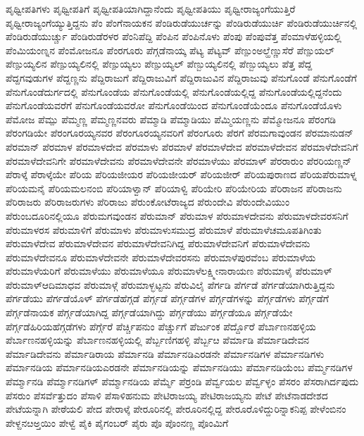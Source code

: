 {ಪೃಥ್ವೀಪತಿಗಳು
ಪೃಥ್ವೀಪತಿಗೆ
ಪೃಥ್ವೀಪತಿಯಾಗಿದ್ದಾನೆಂದು
ಪೃಥ್ವೀಪತಿಯು
ಪೃಥ್ವೀರಾಜ್ಯಂಗೆಯುತ್ತಿರೆ
ಪೃಥ್ವೀರಾಜ್ಯಂಗೆಯ್ಯುತ್ತಿದ್ದನು
ಪೆಂ
ಪೆಂಗೆನಾಯಕನ
ಪೆಂಡಿರುಡೆಯುರ್ಚನ್ನು
ಪೆಂಡಿರುಡೆಯುರ್ಚಿ
ಪೆಂಡಿರುಡೆಯುರ್ಚಿನಲ್ಲಿ
ಪೆಂಡಿರುಡೆಯುರ್ಚ್ಚು
ಪೆಂಡಿರುಡೆರಳರ
ಪೆಂನಿಪೆದ್ದಿ
ಪೆಂಪಿನ
ಪೆಂಪಿನೊಳು
ಪೆಂಪು
ಪೆಂಪುವೆತ್ತ
ಪೆಂಮಾಳೆಹಳ್ಳಿಯಲ್ಲಿ
ಪೆಂಮಿಯಂಣ್ನನ
ಪೆಂಮೋಜನೂ
ಪೆಂರಗೂರು
ಪೆಗ್ಗಡೆನಾಯ್ಕ
ಪೆಟ್ಯ
ಪೆಟ್ಯವ್
ಪೆಣ್ಪುಂಅಲ್ಹೆಣ್ಣುಸೆರೆ
ಪೆಣ್ಪುಯಲ್
ಪೆಣ್ಪುಯ್ಯಲಿನ
ಪೆಣ್ಪುಯ್ಯಲಿನಲ್ಲಿ
ಪೆಣ್ಪುಯ್ಯಲು
ಪೆಣ್ಪುಯ್ಯಲ್
ಪೆಣ್ಬುಯ್ಯಲಿನಲ್ಲಿ
ಪೆಣ್ಬುಯ್ಯಲು
ಪೆತ್ತ
ಪೆದ್ದ
ಪೆದ್ದಗವುಡುಗಳ
ಪೆದ್ದಣ್ಣನು
ಪೆದ್ದಿರಾಜುಗೆ
ಪೆದ್ದಿರಾಜುವಿಗೆ
ಪೆದ್ದಿರಾಜುವಿನ
ಪೆದ್ದಿರಾಜುವು
ಪೆನುಗೊಂಡೆ
ಪೆನುಗೊಂಡೆಗೆ
ಪೆನುಗೊಂಡೆದುರ್ಗದಲ್ಲಿ
ಪೆನುಗೊಂಡೆಯ
ಪೆನುಗೊಂಡೆಯಲ್ಲಿ
ಪೆನುಗೊಂಡೆಯಲ್ಲಿದ್ದ
ಪೆನುಗೊಂಡೆಯಲ್ಲಿದ್ದನೆಂದು
ಪೆನುಗೊಂಡೆಯವರೆಗೆ
ಪೆನುಗೊಂಡೆಯವರೋ
ಪೆನುಗೊಂಡೆಯಿಂದ
ಪೆನುಗೊಂಡೆಯೆಂದೂ
ಪೆನುಗೊಂಡೆಯೊಳು
ಪೆಮೋಜ
ಪೆಮ್ಪು
ಪೆಮ್ಮಣ್ಣ
ಪೆಮ್ಮಣ್ಣನವರು
ಪೆಮ್ಮಾಡಿ
ಪೆಮ್ಮಾಡಿಯು
ಪೆಮ್ಮಿಯಣ್ಣನು
ಪೆಮ್ಮೋಜನೂ
ಪೆರಂಗಡಿ
ಪೆರಂಗಡಿಯೇ
ಪೆರಂಗೂರಯ್ಯನವರ
ಪೆರಂಗೂರಯ್ಯನವರಿಗೆ
ಪೆರಂಗೂರು
ಪೆರಗೆ
ಪೆರಮಗಾವುಂಡನ
ಪೆರಮಾನುಡನ್
ಪೆರಮಾನ್
ಪೆರಮಾಳ
ಪೆರಮಾಳದೇವ
ಪೆರಮಾಳು
ಪೆರಮಾಳೆ
ಪೆರಮಾಳೆದೇವ
ಪೆರಮಾಳೆದೇವನ
ಪೆರಮಾಳೆದೇವನಿಗೆ
ಪೆರಮಾಳೆದೇವನಿಗೇ
ಪೆರಮಾಳೆದೇವನು
ಪೆರಮಾಳೆದೇವನೇ
ಪೆರಮಾಳೆಯು
ಪೆರಮಾಳ್
ಪೆರರಾರುಂ
ಪೆರರಿಯಣ್ಣನ್
ಪೆರಾಳ್ಕೆ
ಪೆರಾಳ್ಕೆಯೇ
ಪೆರಿಯ
ಪೆರಿಯಜೀಯರ
ಪೆರಿಯಜೀಯರ್
ಪೆರಿಯಜೀರ್
ಪೆರಿಯಪುರಾಣದ
ಪೆರಿಯಪೆರುಮಾಳ್ನ
ಪೆರಿಯಮನೈ
ಪೆರಿಯಮಲನಂಬಿ
ಪೆರಿಯಾಳ್ವಾನ್
ಪೆರಿಯಾಳ್ವಿ
ಪೆರಿಯೇರಿ
ಪೆರಿಯೇರಿಯ
ಪೆರಿರಾಜನ
ಪೆರಿರಾಜನು
ಪೆರಿರಾಜರು
ಪೆರಿರಾಜರುಗಳು
ಪೆರಿರಾಜು
ಪೆರುಂಕೋಟೆರಾಜ್ಯದ
ಪೆರುಂದೇವಿ
ಪೆರುಂದೇವಿಯುಂ
ಪೆರುಂಬದೂರಿನಲ್ಲಿಯೂ
ಪೆರುಮಗವುಂಡನ
ಪೆರುಮಾನ್
ಪೆರುಮಾಳ
ಪೆರುಮಾಳದೇವನು
ಪೆರುಮಾಳದೇವರಸನಿಗೆ
ಪೆರುಮಾಳರಸ
ಪೆರುಮಾಳಿಗೆ
ಪೆರುಮಾಳು
ಪೆರುಮಾಳುಸಮುದ್ರ
ಪೆರುಮಾಳೆ
ಪೆರುಮಾಳೆಚಮೂಪತಿಗಿಂತು
ಪೆರುಮಾಳೆದೇವ
ಪೆರುಮಾಳೆದೇವನ
ಪೆರುಮಾಳೆದೇವನಿಗಿದ್ದ
ಪೆರುಮಾಳೆದೇವನಿಗೆ
ಪೆರುಮಾಳೆದೇವನು
ಪೆರುಮಾಳೆದೇವನೂ
ಪೆರುಮಾಳೆದೇವನೇ
ಪೆರುಮಾಳೆದೇವರಸನು
ಪೆರುಮಾಳೆಪುರವೆಂಬ
ಪೆರುಮಾಳೆಯ
ಪೆರುಮಾಳೆಯರಿಗೆ
ಪೆರುಮಾಳೆಯು
ಪೆರುಮಾಳೆಯೂ
ಪೆರುಮಾಳೆಲಕ್ಷ್ಮೀನಾರಾಯಣ
ಪೆರುಮಾಳೈ
ಪೆರುಮಾಳ್
ಪೆರುಮಾಳ್ಆದಿಮಾಧವ
ಪೆರುಮಾಳ್ಗೆ
ಪೆರುಮಾಳ್ಭಟ್ಟನು
ಪೆರುವಿಲೈ
ಪೆರ್ಗಡಿ
ಪೆರ್ಗಡೆ
ಪೆರ್ಗಡೆಯಾಗಿರುತ್ತಿದ್ದನು
ಪೆರ್ಗಡೆಯು
ಪೆರ್ಗಡೆಯೊಳ್
ಪೆರ್ಗಡೆಹೆಗ್ಗಡೆ
ಪೆರ್ಗ್ಗಡೆ
ಪೆರ್ಗ್ಗಡೆಗಳ
ಪೆರ್ಗ್ಗಡೆಗಳನ್ನು
ಪೆರ್ಗ್ಗಡೆಗಳು
ಪೆರ್ಗ್ಗಡೆಗೆ
ಪೆರ್ಗ್ಗಡೆನಾಯಕ
ಪೆರ್ಗ್ಗಡೆಯಾಗಿದ್ದ
ಪೆರ್ಗ್ಗಡೆಯಾಗಿದ್ದು
ಪೆರ್ಗ್ಗಡೆಯು
ಪೆರ್ಗ್ಗಡೆಯೂ
ಪೆರ್ಗ್ಗಡೆಯೇ
ಪೆರ್ಗ್ಗಡೆಹಿರಿಯಹೆಗ್ಗಡೆಗಳು
ಪೆರ್ಗ್ಗೆರೆ
ಪೆರ್ಚ್ಚಿಪನುಂ
ಪೆರ್ಚ್ಚುಗೆ
ಪೆರ್ಜುಂಕ
ಪೆರ್ದ್ದೊರೆ
ಪೆರ್ಬಾಣನಹಳ್ಳಿಯ
ಪೆರ್ಬಾಣನಹಳ್ಳಿಯನ್ನು
ಪೆರ್ಬಾಣನಹಳ್ಳಿಯಲ್ಲಿ
ಪೆರ್ಬ್ಬಣಿಗಹಳ್ಳಿ
ಪೆರ್ಬ್ಬೞ
ಪೆರ್ಮಾಡಿ
ಪೆರ್ಮಾಡಿದೇವನ
ಪೆರ್ಮಾಡಿದೇವನು
ಪೆರ್ಮಾಡಿರಾಯ
ಪೆರ್ಮಾನಡಿ
ಪೆರ್ಮಾನಡಿಎರಡನೇ
ಪೆರ್ಮಾನಡಿಗಳ
ಪೆರ್ಮಾನಡಿಗಳು
ಪೆರ್ಮಾನಡಿಯ
ಪೆರ್ಮಾನಡಿಯಎರಡನೇ
ಪೆರ್ಮಾನಡಿಯನ್ನು
ಪೆರ್ಮಾನಡಿಯು
ಪೆರ್ಮಾನಡಿಯೆಂಬ
ಪೆರ್ಮ್ಮನಡಿಗಳ
ಪೆರ್ಮ್ಮಾನಡಿ
ಪೆರ್ಮ್ಮಾನಡಿಗಳ್
ಪೆರ್ಮ್ಮಾನಡಿಯ
ಪೆರ್ಮ್ಮೆ
ಪೆರ್ರಂಡಿ
ಪೆರ್ವ್ವಯಲ
ಪೆರ್ವ್ವಳ್ಳಂ
ಪೆಸರಂ
ಪೆಸರಾಗಿರ್ದಪುದು
ಪೆಸರುಂ
ಪೆಸರ್ವೆತ್ತುದಂ
ಪೆಸಾಳಿ
ಪೆಸಾಳಿಹನುಮ
ಪೇಟಿರಾಜಯ್ಯ
ಪೇಟಿರಾಜಯ್ಯನು
ಪೇಟೆ
ಪೇಟೆನಾಡದೇಶದ
ಪೇಟೆಯನ್ನಾಗಿ
ಪೇಠೆಯಲಿ
ಪೇದ
ಪೇರಾಳ್ಕೆ
ಪೇರೂರಿನಲ್ಲಿ
ಪೇರೂರಿನಲ್ಲಿದ್ದ
ಪೇರೂರೊಳಿದ್ದುರಿನ್ನಾಕನಿಪ್ಪ
ಪೇಳೆಂಬಿನಂ
ಪೇಳ್ದನೞಅ್ತಯಿಂ
ಪೇಳ್ವೆ
ಪೈಕಿ
ಪೈಗಂಬರ್
ಪೈರು
ಪೊ
ಪೊಂನಣ್ಣ
ಪೊಂಮಿಗೆ
}
